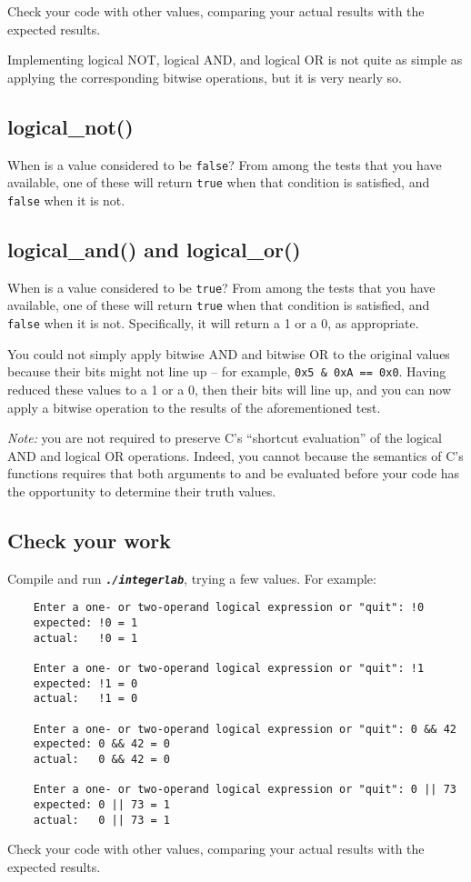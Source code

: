 Check your code with other values, comparing your actual results with the expected results.


\vspace{0.5cm}

Implementing logical NOT, logical AND, and logical OR is not quite as simple as applying the corresponding bitwise operations, but it is very nearly so.

\subsection{logical\_not()}

When is a value considered to be \lstinline{false}?
From among the tests that you have available, one of these will return \lstinline{true} when that condition is satisfied, and \lstinline{false} when it is not.

\subsection{logical\_and() and logical\_or()}

When is a value considered to be \lstinline{true}?
From among the tests that you have available, one of these will return \lstinline{true} when that condition is satisfied, and \lstinline{false} when it is not.
Specifically, it will return a 1 or a 0, as appropriate.

You could not simply apply bitwise AND and bitwise OR to the original values because their bits might not line up -- for example, \lstinline{0x5 & 0xA == 0x0}.
Having reduced these values to a 1 or a 0, then their bits will line up, and you can now apply a bitwise operation to the results of the aforementioned test.

\textit{Note:} you are not required to preserve C's ``shortcut evaluation'' of the logical AND and logical OR operations.
Indeed, you cannot because the semantics of C's functions requires that both arguments to  and  be evaluated before your code has the opportunity to determine their truth values.


\subsection*{Check your work}

Compile and run \texttt{\textbf{\textit{./integerlab}}}, trying a few values.
For example:
\begin{verbatim}
    Enter a one- or two-operand logical expression or "quit": !0
    expected: !0 = 1
    actual:   !0 = 1

    Enter a one- or two-operand logical expression or "quit": !1
    expected: !1 = 0
    actual:   !1 = 0

    Enter a one- or two-operand logical expression or "quit": 0 && 42
    expected: 0 && 42 = 0
    actual:   0 && 42 = 0

    Enter a one- or two-operand logical expression or "quit": 0 || 73
    expected: 0 || 73 = 1
    actual:   0 || 73 = 1
\end{verbatim}

Check your code with other values, comparing your actual results with the expected results.
